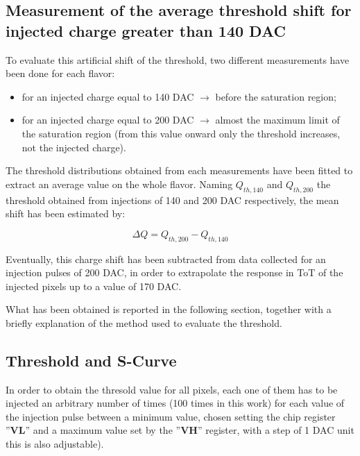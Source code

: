 \subsection{Measurement of the average threshold shift for injected charge greater than 140 DAC}

To evaluate this artificial shift of the threshold, two different measurements have been done for each flavor:

\begin{itemize}
\item for an injected charge equal to 140 DAC $\rightarrow$ before the saturation region;
\item for an injected charge equal to 200 DAC $\rightarrow$ almost the maximum limit of the saturation region (from this value onward only the threshold increases, not the injected charge).
\end{itemize}

The threshold distributions obtained from each measurements have been fitted to extract an average value on the whole flavor. Naming $Q_{th, 140}$ and $Q_{th, 200}$  the threshold obtained from injections of 140 and 200 DAC respectively, the mean shift has been estimated by:

\begin{equation}
\Delta Q = Q_{th,200} - Q_{th,140}
\end{equation}

Eventually, this charge shift has been subtracted from data collected for an injection pulses of 200 DAC, in order to extrapolate the response in ToT of the injected pixels up to a value of 170 DAC.

What has been obtained is reported in the following section, together with a briefly explanation of the method used to evaluate the threshold.


\subsection{Threshold and S-Curve}

In order to obtain the thresold value for all pixels, each one of them has to be injected an arbitrary number of times (100 times in this work) for each value of the injection pulse between a minimum value, chosen setting the chip register ''\textbf{VL}'' and a maximum value set by the ''\textbf{VH}'' register, with a step of 1 DAC unit this is also adjustable).

